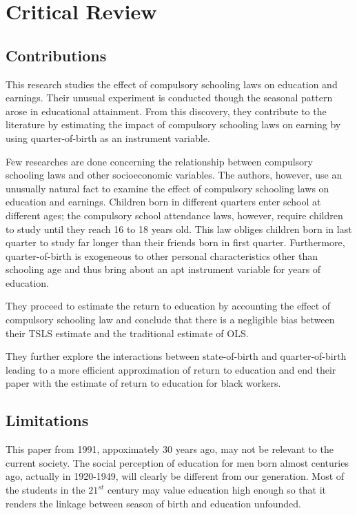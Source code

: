\documentclass{article}
\begin{document}
\section{Critical Review}

\subsection{Contributions}

This research studies the effect of compulsory schooling laws on education and earnings. Their unusual experiment is conducted though the seasonal pattern arose in educational attainment.
From this discovery, they contribute to the literature by estimating the impact of compulsory schooling laws on earning by using quarter-of-birth as an instrument variable.

Few researches are done concerning the relationship between compulsory schooling laws and other socioeconomic variables. The authors, however, use an unusually natural fact to examine the effect of compulsory schooling laws on education and earnings. Children born in different quarters enter school at different ages; the compulsory school attendance laws, however, require children to study until they reach 16 to 18 years old. This law obliges children born in last quarter to study far longer than their friends born in first quarter. Furthermore, quarter-of-birth is exogeneous to other personal characteristics other than schooling age and thus bring about an apt instrument variable for years of education.

They proceed to estimate the return to education by accounting the effect of compulsory schooling law and conclude that there is a negligible bias between their TSLS estimate and the traditional estimate of OLS.

They further explore the interactions between state-of-birth and quarter-of-birth leading to a more efficient approximation of return to education and end their paper with the estimate of return to education for black workers.

\subsection{Limitations}

This paper from 1991, appoximately 30 years ago, may not be relevant to the current society. The social perception of education for men born almost centuries ago, actually in 1920-1949, will clearly be different from our generation. Most of the students in the $21^{st}$ century may value education high enough so that it renders the linkage between season of birth and education unfounded. 
\end{document}
